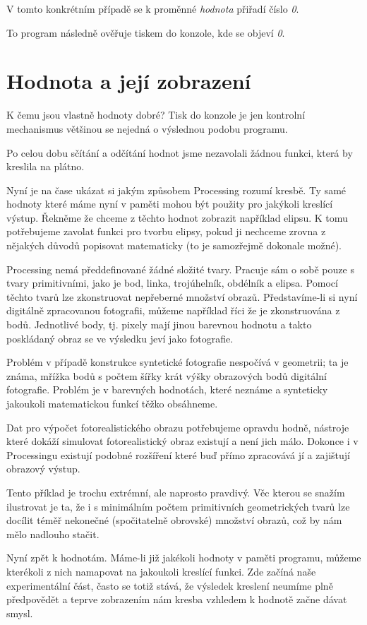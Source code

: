 \documentclass[11pt]{book}
\newcommand{\oddil}[1]{\section{#1}\label{sec:#1}}
\begin{document}
V tomto konkrétním případě se k proměnné {\em hodnota} přiřadí číslo {\em 0}.

To program následně ověřuje tiskem do konzole, kde se objeví {\em 0}.

\oddil{Hodnota a její zobrazení}

K čemu jsou vlastně hodnoty dobré? Tisk do konzole je jen kontrolní mechanismus většinou se nejedná o výslednou podobu programu.

Po celou dobu sčítání a odčítání hodnot jsme nezavolali žádnou funkci, která by kreslila na plátno.

Nyní je na čase ukázat si jakým způsobem Processing rozumí kresbě. Ty samé hodnoty které máme nyní v paměti mohou být použity pro jakýkoli kreslící výstup. Řekněme že chceme z těchto hodnot zobrazit například elipsu. K tomu potřebujeme zavolat funkci pro tvorbu elipsy, pokud ji nechceme zrovna z nějakých důvodů popisovat matematicky (to je samozřejmě dokonale možné).

Processing nemá předdefinované žádné složité tvary. Pracuje sám o sobě pouze s tvary primitivními, jako je bod, linka, trojúhelník, obdélník a elipsa. Pomocí těchto tvarů lze zkonstruovat nepřeberné množství obrazů. Představíme-li si nyní digitálně zpracovanou fotografii, můžeme například říci že je zkonstruována z bodů. Jednotlivé body, tj. pixely mají jinou barevnou hodnotu a takto poskládaný obraz se ve výsledku jeví jako fotografie.

Problém v případě konstrukce syntetické fotografie nespočívá v geometrii; ta je známa, mřížka bodů s počtem šířky krát výšky obrazových bodů digitální fotografie. Problém je v barevných hodnotách, které neznáme a synteticky jakoukoli matematickou funkcí těžko obsáhneme.

Dat pro výpočet fotorealistického obrazu potřebujeme opravdu hodně, nástroje které dokáží simulovat fotorealistický obraz existují a není jich málo. Dokonce i v Processingu existují podobné rozšíření které buď přímo zpracovává jí a zajištují obrazový výstup.

Tento příklad je trochu extrémní, ale naprosto pravdivý. Věc kterou se snažím ilustrovat je ta, že i s minimálním počtem primitivních geometrických tvarů lze docílit téměř nekonečné (spočitatelně obrovské) množství obrazů, což by nám mělo nadlouho stačit.

Nyní zpět k hodnotám. Máme-li již jakékoli hodnoty v paměti programu, můžeme kterékoli z nich namapovat na jakoukoli kreslící funkci. Zde začíná naše experimentální část, často se totiž stává, že výsledek kreslení neumíme plně předpovědět a teprve zobrazením nám kresba vzhledem k hodnotě začne dávat smysl.
\end{document}
